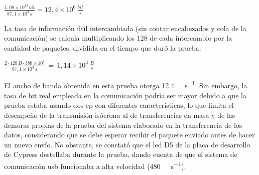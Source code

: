 \begin{center}
	\begin{math}
		\frac{\displaystyle 1,08\times 10^{12}\,bit}{\displaystyle 87,1 \times 10^3\,s}= 12,4 \times 10^6\,\frac{\displaystyle bit}{\displaystyle s}
	\end{math}
\end{center}

La tasa de información útil intercambiada (sin contar encabezados y cola de la comunicación) se calcula multiplicando los \SI{128}{\byte} de cada intercambio por la cantidad de paquetes, dividida en el tiempo que duró la prueba:

\begin{center}
	\begin{math}
		\frac{\displaystyle 2 \cdot 128 \, B \cdot 388 \times 10^3}{\displaystyle 87,1 \times 10^3\,s}\, = \, 1,14\times 10^3\,\frac{\displaystyle B}{\displaystyle s}
	\end{math}
\end{center}

El ancho de banda obtenida en esta prueba otorga \SI{12,4}{\mega\bit\per\second}. Sin embargo, la tasa de bit real empleada en la comunicación podría ser mayor debido a que la prueba estaba usando dos \acrshort{ep} con diferentes características, lo que limita el desempeño de la transmisión isócrona al de transferencias en masa y de las demoras propias de la prueba del sistema elaborado en la transferencia de los datos, considerando que se debe esperar recibir el paquete enviado antes de hacer un nuevo envío. No obstante, se constató que el \acrshort{led} D5 de la placa de desarrollo de Cypress destellaba durante la prueba, dando cuenta de que el sistema de comunicación \acrshort{usb} funcionaba a alta velocidad (\SI{480}{\mega\bit\per\second}).

